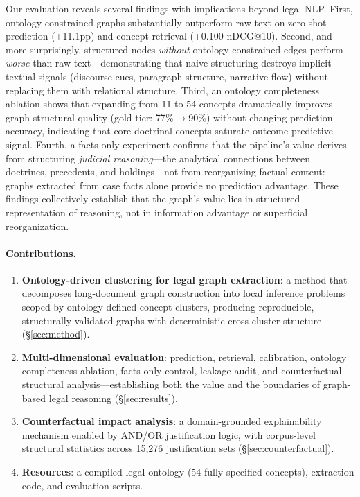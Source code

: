 \documentclass[11pt]{article}
\begin{document}
Our evaluation reveals several findings with implications beyond legal NLP. First, ontology-constrained graphs substantially outperform raw text on zero-shot prediction (+11.1pp) and concept retrieval (+0.100 nDCG@10). Second, and more surprisingly, structured nodes \emph{without} ontology-constrained edges perform \emph{worse} than raw text---demonstrating that naive structuring destroys implicit textual signals (discourse cues, paragraph structure, narrative flow) without replacing them with relational structure. Third, an ontology completeness ablation shows that expanding from 11 to 54 concepts dramatically improves graph structural quality (gold tier: 77\%$\rightarrow$90\%) without changing prediction accuracy, indicating that core doctrinal concepts saturate outcome-predictive signal. Fourth, a facts-only experiment confirms that the pipeline's value derives from structuring \emph{judicial reasoning}---the analytical connections between doctrines, precedents, and holdings---not from reorganizing factual content: graphs extracted from case facts alone provide no prediction advantage. These findings collectively establish that the graph's value lies in structured representation of reasoning, not in information advantage or superficial reorganization.

\paragraph{Contributions.}
\begin{enumerate}[nosep,leftmargin=*]
\item \textbf{Ontology-driven clustering for legal graph extraction}: a method that decomposes long-document graph construction into local inference problems scoped by ontology-defined concept clusters, producing reproducible, structurally validated graphs with deterministic cross-cluster structure (\S\ref{sec:method}).
\item \textbf{Multi-dimensional evaluation}: prediction, retrieval, calibration, ontology completeness ablation, facts-only control, leakage audit, and counterfactual structural analysis---establishing both the value and the boundaries of graph-based legal reasoning (\S\ref{sec:results}).
\item \textbf{Counterfactual impact analysis}: a domain-grounded explainability mechanism enabled by AND/OR justification logic, with corpus-level structural statistics across 15,276 justification sets (\S\ref{sec:counterfactual}).
\item \textbf{Resources}: a compiled legal ontology (54 fully-specified concepts), extraction code, and evaluation scripts.
\end{enumerate}
\end{document}
